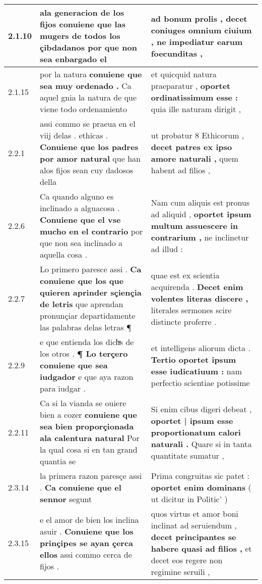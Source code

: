 \begin{tabular}{|p{1cm}|p{6.5cm}|p{6.5cm}|}
2.1.10 & ala generacion de los fijos \textbf{ conuiene que las mugers de todos los çibdadanos } por que non sea enbargado el & ad bonum prolis , \textbf{ decet coniuges omnium ciuium , } ne impediatur earum foecunditas , \\\hline
2.1.15 & por la natura \textbf{ conuiene que sea muy ordenado . } Ca aquel gnia la natura de que viene todo ordenamiento & et quicquid natura praeparatur , \textbf{ oportet ordinatissimum esse : } quia ille naturam dirigit , \\\hline
2.2.1 & assi commo se praeua en el viij delas . ethicas . \textbf{ Conuiene que los padres por amor natural } que han alos fijos sean cuy dadosos della & ut probatur 8 Ethicorum , \textbf{ decet patres ex ipso amore naturali , } quem habent ad filios , \\\hline
2.2.6 & Ca quando alguno es inclinado a alguacosa . \textbf{ Conuiene que el vse mucho en el contrario } por que non sea inclinado a aquella cosa . & Nam cum aliquis est pronus ad aliquid , \textbf{ oportet ipsum multum assuescere in contrarium , } ne inclinetur ad illud : \\\hline
2.2.7 & Lo primero paresce assi . \textbf{ Ca conuiene que los que quieren aprinder sçiençia de letris } que aprendan pronunçiar departidamente las palabras delas letras ¶ & quae est ex scientia acquirenda . \textbf{ Decet enim volentes literas discere , } literales sermones scire distincte proferre . \\\hline
2.2.9 & e que entienda los dichͣs de los otros . \textbf{ ¶ Lo terçero conuiene que sea iudgador } e que aya razon para iudgar . & et intelligens aliorum dicta . \textbf{ Tertio oportet ipsum esse iudicatiuum : } nam perfectio scientiae potissime \\\hline
2.2.11 & Ca si la vianda se ouiere bien a cozer \textbf{ conuiene que sea bien proporçionada ala calentura natural } Por la qual cosa si en tan grand quantia se & Si enim cibus digeri debeat , \textbf{ oportet | ipsum esse proportionatum calori naturali . } Quare si in tanta quantitate sumatur , \\\hline
2.3.14 & la primera razon paresçe assi . \textbf{ Ca conuiene que el sennor } segunt & Prima congruitas sic patet : \textbf{ oportet enim dominans } ( ut dicitur in Politic’ ) \\\hline
2.3.15 & e el amor de bien los inclina asuir . \textbf{ Conuiene que los prinçipes se ayan çerca ellos } assi commo cerca de fijos . & quos virtus et amor boni inclinat ad seruiendum , \textbf{ decet principantes se habere quasi ad filios , } et decet eos regere non regimine seruili , \\\hline

\end{tabular}
